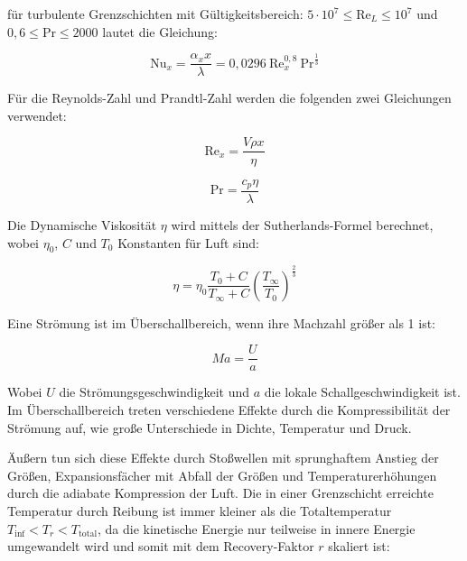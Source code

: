für turbulente Grenzschichten mit Gültigkeitsbereich: $5 \cdot 10^7 \leq \text{Re}_L \leq 10^7$ und $ 0,6 \leq \text{Pr} \leq 2000$ lautet die Gleichung:

\begin{equation}
  \label{eq:nusselt_turbulent}
  \text{Nu}_x = \frac{\alpha_x x}{\lambda} = 0,0296 \ \text{Re}_x^{0,8} \ \text{Pr}^{\frac{1}{3}}
\end{equation}

Für die Reynolds-Zahl und Prandtl-Zahl werden die folgenden zwei Gleichungen verwendet:

\noindent\begin{minipage}{.5\linewidth}
  \begin{equation}
    \label{eq:reynolds}
    \text{Re}_x = \frac{V \rho x}{\eta}
  \end{equation}
\end{minipage}%
\begin{minipage}{.5\linewidth}
  \begin{equation}
    \label{eq:prandtl}
    \text{Pr} = \frac{c_p \eta}{\lambda}
  \end{equation}
\end{minipage}

Die Dynamische Viskosität $\eta$ wird mittels der Sutherlands-Formel berechnet, wobei $\eta_0$, $C$ und $T_0$ Konstanten für Luft sind:

\begin{equation}
  \label{eq:dynamische_viskositaet}
  \eta = \eta_0 \frac{T_0 + C}{T_{\infty} + C} {\left( \frac{T_{\infty}}{T_0} \right)}^{\frac{2}{3}}
\end{equation}

Eine Strömung ist im Überschallbereich, wenn ihre Machzahl größer als 1 ist:

\begin{equation}
  \label{eq:machzahl}
  Ma = \frac{U}{a}
\end{equation}

Wobei $U$ die Strömungsgeschwindigkeit und $a$ die lokale Schallgeschwindigkeit ist. Im Überschallbereich treten verschiedene
Effekte durch die Kompressibilität der Strömung auf, wie große Unterschiede in Dichte, Temperatur und Druck.

Äußern tun sich diese Effekte durch Stoßwellen mit sprunghaftem Anstieg der Größen, Expansionsfächer mit Abfall der Größen und
Temperaturerhöhungen durch die adiabate Kompression der Luft. Die in einer Grenzschicht erreichte Temperatur durch Reibung
ist immer kleiner als die Totaltemperatur $T_{\inf} < T_r < T_\mathrm{total}$, da die kinetische Energie nur teilweise in innere Energie
umgewandelt wird und somit mit dem Recovery-Faktor $r$ skaliert ist:

